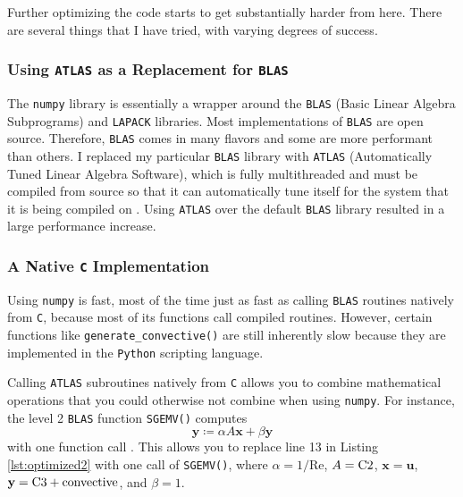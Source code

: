 Further optimizing the code starts to get substantially harder from here. There are several things that I have tried, with varying degrees of success.

\subsubsection{Using \texttt{ATLAS} as a Replacement for \texttt{BLAS}}

The \texttt{numpy} library is essentially a wrapper around the \texttt{BLAS} (Basic Linear Algebra Subprograms) and \texttt{LAPACK} libraries. Most implementations of \texttt{BLAS} are open source. Therefore, \texttt{BLAS} comes in many flavors and some are more performant than others. I replaced my particular \texttt{BLAS} library with \texttt{ATLAS} (Automatically Tuned Linear Algebra Software), which is fully multithreaded and must be compiled from source so that it can automatically tune itself for the system that it is being compiled on \parencite{whaley1997automatically}. Using \texttt{ATLAS} over the default \texttt{BLAS} library resulted in a large performance increase.

\subsubsection{A Native \texttt{C} Implementation}

Using \texttt{numpy} is fast, most of the time just as fast as calling \texttt{BLAS} routines natively from \texttt{C}, because most of its functions call compiled routines. However, certain functions like \lstinline|generate_convective()| are still inherently slow because they are implemented in the \texttt{Python} scripting language. 
 
Calling \texttt{ATLAS} subroutines natively from \texttt{C} allows you to combine mathematical operations that you could otherwise not combine when using \texttt{numpy}. For instance, the level 2 \texttt{BLAS} function \texttt{SGEMV()} computes
\begin{equation}
    \mathbf{y} \coloneqq \alpha A \mathbf{x} + \beta \mathbf{y}
\end{equation}
with one function call \parencite{anderson1999lapack}. This allows you to replace line 13 in Listing \ref{lst:optimized2} with one call of \texttt{SGEMV()}, where $\alpha = 1 / \text{Re}$, $A = \text{\lstinline|C2|}$, $\mathbf{x} = \mathbf{u}$, $\mathbf{y} = \text{\lstinline|C3|} + \text{convective}$, and $\beta = 1$.
        
